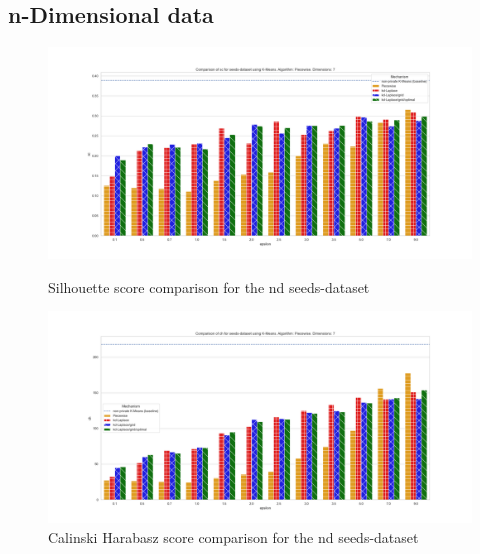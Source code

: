 \subsection{n-Dimensional data}
\begin{figure}[H]
    \centering
    \begin{minipage}[c]{0.8\textwidth}
        \includegraphics[width=1\textwidth]{Results/RQ2-nd/seeds-dataset/sc_seeds-dataset_comparison.png}
        \caption{Silhouette score comparison for the nd seeds-dataset}
        \label{fig:appendix-sc_seeds-dataset_comparison_nd}
    \end{minipage}
    \begin{minipage}[c]{0.8\textwidth}
        \includegraphics[width=1\textwidth]{Results/RQ2-nd/seeds-dataset/ch_seeds-dataset_comparison.png}
        \caption{Calinski Harabasz score comparison for the nd seeds-dataset}
        \label{fig:appendix-ch_seeds-dataset_comparison_nd}
    \end{minipage}
\end{figure}
